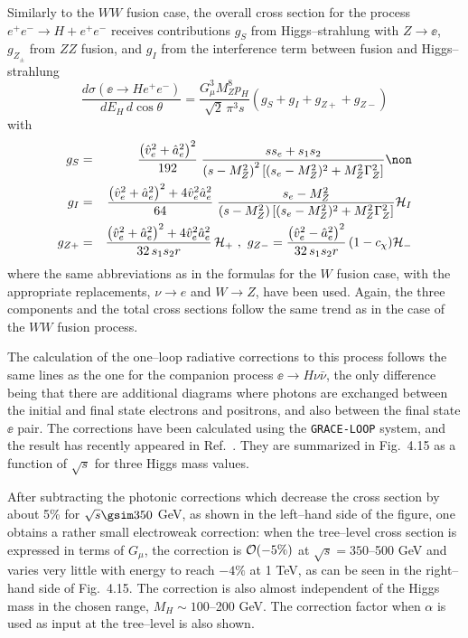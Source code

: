 {Similarly to the $WW$ fusion case,  the overall cross section for the process
$e^+e^- \to H + e^+e^-$ receives contributions $g_S$ from Higgs--strahlung with
$Z \to \ee$, $g_{Z_\pm}$ from $ZZ$ fusion, and $g_I$ from the interference term 
between fusion and Higgs--strahlung \cite{ZZH-Kilian}
\begin{equation}\label{totalZZ}
  \frac{d\sigma(\ee \to He^+e^-)}{dE_H\,d\cos\theta}
  = \frac{G_\mu^3 M_Z^8p_H}{\sqrt2\,\pi^3s}
  \left(g_S + g_I + g_{Z+} + g_{Z-} \right)
\end{equation}
with
\begin{eqnarray}
  g_S &=& \frac{\left(\hat{v}_e^2+\hat{a}_e^2\right)^2}{192}\;
    \frac{ss_e + s_1s_2}{\left(s-M_Z^2\right)^2
               \left[(s_e-M_Z^2)^2 + M_Z^2\Gamma_Z^2\right]}\non \\
  g_I &=& \frac{\left(\hat{v}_e^2+\hat{a}_e^2\right)^2+4\hat{v}_e^2
  \hat{a}_e^2}{64}\;
    \frac{s_e-M_Z^2}{\left(s-M_Z^2\right) 
                \left[(s_e-M_Z^2)^2 + M_Z^2\Gamma_Z^2\right]} {\cal H}_I
    \nonumber\\
  g_{Z+} &=& \frac{\left(\hat{v}_e^2+\hat{a}_e^2\right)^2+4\hat{v}_e^2
 \hat{a}_e^2} {32\, s_1 s_2 r}\, {\cal H}_+    \ , \
  g_{Z-} = \frac{\left(\hat{v}_e^2-\hat{a}_e^2\right)^2}{32\, s_1 s_2 r}\,
        (1 - c_\chi){\cal H}_-
\end{eqnarray}
where the same abbreviations as in the formulas for the $W$ fusion case, with
the appropriate replacements, $\nu\to e$ and $W\to Z$, have been used. Again, 
the three components and the total cross sections follow the same trend as in 
the case of the $WW$ fusion process. \s

The calculation of the one--loop  radiative corrections to this process follows
the same lines as the one for the companion process $\ee \to H \nu \bar{\nu}$,
the only difference being that there are additional diagrams where photons are
exchanged between the initial and final state electrons and positrons, and also
between the final state $\ee$ pair. The corrections have been calculated using
the {\tt GRACE-LOOP} \cite{GRACE} system, and the result has recently appeared 
in Ref.~\cite{RCZZ}. They are summarized in Fig.~4.15 as a function of $\sqrt 
s$  for three Higgs mass values.\s

After subtracting the photonic corrections which decrease the cross section by
about 5\% for $\sqrt{s} \gsim 350$ GeV, as shown in the left--hand side of 
the figure, one obtains a rather small electroweak correction: when the 
tree--level cross section is expressed in terms of $G_\mu$, the correction is 
${\cal O}(-5\%)$ at $\sqrt{s}=350$--500 GeV and varies very little with energy 
to reach $-4\%$ at 1 TeV, as can be seen in the right--hand side of Fig.~4.15. 
The correction is also almost independent of the Higgs mass in the chosen 
range, $M_H \sim 100$--200 GeV. The correction factor when $\alpha$ 
is used as input at the tree--level is also shown.\s

}
